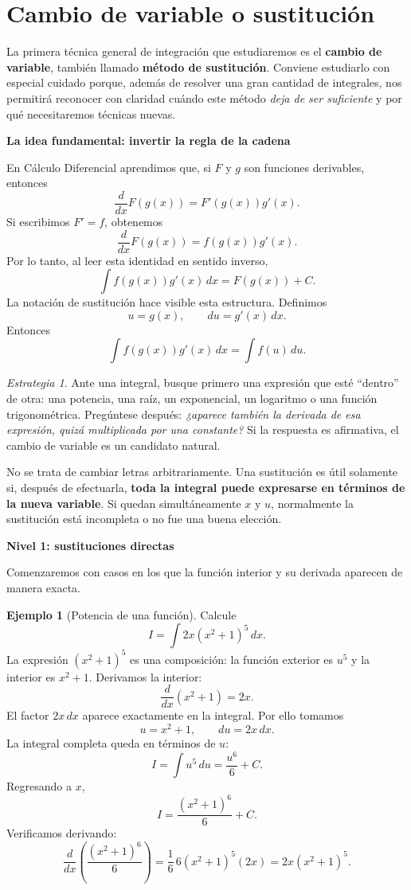 \documentclass[12pt]{article}
\theoremstyle{definition}
\newtheorem{ejemplo}[teorema]{Ejemplo}
\theoremstyle{remark}
\newtheorem*{estrategia}{Estrategia}
\begin{document}
\section{Cambio de variable o sustitución}

La primera técnica general de integración que estudiaremos es el \textbf{cambio de variable}, también llamado \textbf{método de sustitución}. Conviene estudiarlo con especial cuidado porque, además de resolver una gran cantidad de integrales, nos permitirá reconocer con claridad cuándo este método \emph{deja de ser suficiente} y por qué necesitaremos técnicas nuevas.

\textbf{La idea fundamental: invertir la regla de la cadena}

En Cálculo Diferencial aprendimos que, si $F$ y $g$ son funciones derivables, entonces
\[
\frac{d}{dx}F(g(x))=F'(g(x))g'(x).
\]
Si escribimos $F'=f$, obtenemos
\[
\frac{d}{dx}F(g(x))=f(g(x))g'(x).
\]
Por lo tanto, al leer esta identidad en sentido inverso,
\[
\boxed{\int f(g(x))g'(x)\,dx=F(g(x))+C.}
\]
La notación de sustitución hace visible esta estructura. Definimos
\[
u=g(x),\qquad du=g'(x)\,dx.
\]
Entonces
\[
\boxed{\int f(g(x))g'(x)\,dx=\int f(u)\,du.}
\]

\begin{estrategia}
Ante una integral, busque primero una expresión que esté ``dentro'' de otra: una potencia, una raíz, un exponencial, un logaritmo o una función trigonométrica. Pregúntese después: \emph{¿aparece también la derivada de esa expresión, quizá multiplicada por una constante?} Si la respuesta es afirmativa, el cambio de variable es un candidato natural.
\end{estrategia}

No se trata de cambiar letras arbitrariamente. Una sustitución es útil solamente si, después de efectuarla, \textbf{toda la integral puede expresarse en términos de la nueva variable}. Si quedan simultáneamente $x$ y $u$, normalmente la sustitución está incompleta o no fue una buena elección.

\textbf{Nivel 1: sustituciones directas}

Comenzaremos con casos en los que la función interior y su derivada aparecen de manera exacta.

\begin{ejemplo}[Potencia de una función]
Calcule
\[
I=\int 2x(x^2+1)^5\,dx.
\]
La expresión $(x^2+1)^5$ es una composición: la función exterior es $u^5$ y la interior es $x^2+1$. Derivamos la interior:
\[
\frac{d}{dx}(x^2+1)=2x.
\]
El factor $2x\,dx$ aparece exactamente en la integral. Por ello tomamos
\[
u=x^2+1,\qquad du=2x\,dx.
\]
La integral completa queda en términos de $u$:
\[
I=\int u^5\,du=\frac{u^6}{6}+C.
\]
Regresando a $x$,
\[
\boxed{I=\frac{(x^2+1)^6}{6}+C.}
\]
Verificamos derivando:
\[
\frac{d}{dx}\left(\frac{(x^2+1)^6}{6}\right)
=\frac16\,6(x^2+1)^5(2x)=2x(x^2+1)^5.
\]
\end{ejemplo}
\end{document}
